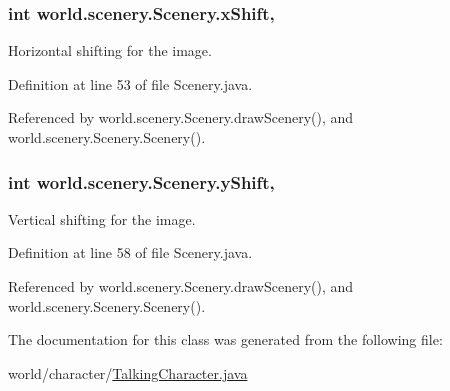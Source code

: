 \hypertarget{classworld_1_1scenery_1_1_scenery_a0999f105f7630fd67fd9d440da6983aa}{
\subsubsection[{x\-Shift}]{\setlength{\rightskip}{0pt plus 5cm}int world.\-scenery.\-Scenery.\-x\-Shift\hspace{0.3cm}{\ttfamily [protected]}, {\ttfamily [inherited]}}}\label{classworld_1_1scenery_1_1_scenery_a0999f105f7630fd67fd9d440da6983aa}


Horizontal shifting for the image. 



Definition at line 53 of file Scenery.\-java.



Referenced by world.\-scenery.\-Scenery.\-draw\-Scenery(), and world.\-scenery.\-Scenery.\-Scenery().

\hypertarget{classworld_1_1scenery_1_1_scenery_ac9ca2c17cf6920deffe490c013b0e638}{
\subsubsection[{y\-Shift}]{\setlength{\rightskip}{0pt plus 5cm}int world.\-scenery.\-Scenery.\-y\-Shift\hspace{0.3cm}{\ttfamily [protected]}, {\ttfamily [inherited]}}}\label{classworld_1_1scenery_1_1_scenery_ac9ca2c17cf6920deffe490c013b0e638}


Vertical shifting for the image. 



Definition at line 58 of file Scenery.\-java.



Referenced by world.\-scenery.\-Scenery.\-draw\-Scenery(), and world.\-scenery.\-Scenery.\-Scenery().



The documentation for this class was generated from the following file\-:\begin{DoxyCompactItemize}
\item 
world/character/\hyperlink{_talking_character_8java}{Talking\-Character.\-java}\end{DoxyCompactItemize}
